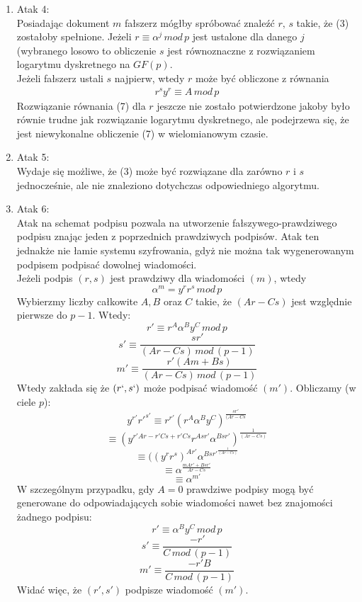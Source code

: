 \documentclass[12pt,a4paper]{article}
\begin{document}
\begin{enumerate}
\begin{enumerate}
        \item Atak 4:\\
        Posiadając dokument $m$ fałszerz mógłby spróbować znaleźć $r,\,s$ takie, że (3) zostałoby spełnione. Jeżeli $r\equiv \alpha^{j}\,mod\,p$ jest ustalone dla danego $j$ (wybranego losowo to obliczenie $s$ jest równoznaczne z rozwiązaniem logarytmu dyskretnego na $GF(p)$.\\
        Jeżeli fałszerz ustali $s$ najpierw, wtedy $r$ może być obliczone z równania 
        \begin{gather}
            r^{s}y^{r} \equiv A\,mod\,p
        \end{gather}
        Rozwiązanie równania (7) dla $r$ jeszcze nie zostało potwierdzone jakoby było równie trudne jak rozwiązanie logarytmu dyskretnego, ale podejrzewa się, że jest niewykonalne obliczenie (7) w wielomianowym czasie. 
        \item Atak 5:\\
        Wydaje się możliwe, że (3) może być rozwiązane dla zarówno $r$ i $s$ jednocześnie, ale nie znaleziono dotychczas odpowiedniego algorytmu.
        \item Atak 6:\\
        Atak na schemat podpisu pozwala na utworzenie fałszywego-prawdziwego podpisu znając jeden z poprzednich prawdziwych podpisów. Atak ten jednakże nie łamie systemu szyfrowania, gdyż nie można tak wygenerowanym podpisem podpisać dowolnej wiadomości.\\
        Jeżeli podpis $(r, s)$ jest prawdziwy dla wiadomości $(m)$, wtedy
        \[\alpha^{m}=y^{r}r^{s}\,mod\,p\]
        Wybierzmy liczby całkowite $A,B$ oraz $C$ takie, że $(Ar-Cs)$ jest względnie pierwsze do $p-1$. Wtedy:
        \[
        r' \equiv r^{A}\alpha^{B}y^{C}\,mod\,p\]
       \[ s'\equiv \frac{sr'}{(Ar - Cs)\,mod\,(p-1)}\]
       \[ m'\equiv\frac{r'(Am+Bs)}{(Ar - Cs)\,mod\,(p-1)}
        \]
        Wtedy zakłada się że $(r`,s`)$ może podpisać wiadomość $(m')$.
        Obliczamy (w ciele $p$):
        \[y^{r'}r'^{s'} \equiv r^{r'}(r^{A}\alpha^{B}y^{C})^{\frac{sr'}{(Ar-Cs}}\]
        \[\equiv(y^{r'Ar-r'Cs+r'Cs}r^{Asr'}\alpha^{Bsr'})^{\frac{1}{(Ar-Cs)}}\]
        \[\equiv((y^{r}r^{s})^{Ar'}\alpha^{Bsr'}^{\frac{1}{(Ar-Cs)}}\]
        \[\equiv\alpha^{\frac{mAr'+Bsr'}{Ar-Cs}}\]
        \[\equiv\alpha^{m'}\]
        W szczególnym przypadku, gdy $A=0$ prawdziwe podpisy mogą być generowane do odpowiadających sobie wiadomości nawet bez znajomości żadnego podpisu:
        \[r'\equiv\alpha^{B}y^{C}\,mod\,p\]
        \[s'\equiv\frac{-r'}{C\,mod\,(p-1)}\]
        \[m'\equiv\frac{-r'B}{C\,mod\,(p-1)}\]
        Widać więc, że $(r', s')$ podpisze wiadomość $(m')$.
    \end{enumerate}
\end{enumerate}
\end{document}
